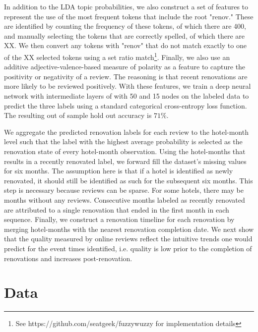 \documentclass[12pt, leqno]{article}
\begin{document}
In addition to the LDA topic probabilities, we also construct a set of features to represent the use of the most frequent tokens that include the root "renov." These are identified by counting the frequency of these tokens, of which there are 400, and manually selecting the tokens that are correctly spelled, of which there are XX. We then convert any tokens with "renov" that do not match exactly to one of the XX selected tokens using a set ratio match\footnote{See https://github.com/seatgeek/fuzzywuzzy for implementation details}. Finally, we also use an additive adjective-valence-based measure of polarity as a feature to capture the positivity or negativity of a review. The reasoning is that recent renovations are more likely to be reviewed positively. With these features, we train a deep neural network with intermediate layers of with 50 and 15 nodes on the labeled data to predict the three labels using a standard categorical cross-entropy loss function. The resulting out of sample hold out accuracy is $71\%$. 

We aggregate the predicted renovation labels for each review to the hotel-month level such that the label with the highest average probability is selected as the renovation state of every hotel-month observation. Using the hotel-months that results in a recently renovated label, we forward fill the dataset's missing values for six months. The assumption here is that if a hotel is identified as newly renovated, it should still be identified as such for the subsequent six months. This step is necessary because reviews can be sparse. For some hotels, there may be months without any reviews. Consecutive months labeled as recently renovated are attributed to a single renovation that ended in the first month in each sequence. Finally, we construct a renovation timeline for each renovation by merging hotel-months with the nearest renovation completion date. We next show that the quality measured by online reviews reflect the intuitive trends one would predict for the event times identified, i.e. quality is low prior to the completion of renovations and increases post-renovation.



\section*{Data} \label{sec:data}
\end{document}
